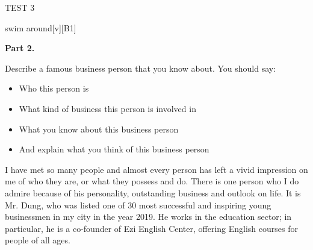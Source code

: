 \begin{glossarymc}[Cambridge 15]
\begin{test}{TEST 3}
\begin{VocabExplain}[Part 1]
            \begin{ExplainCard}{swim around}[v][B1]
            \end{ExplainCard}
        \end{VocabExplain}

    \noindent
    \textbf{Part 2.}
    \begin{qa}{Describe a famous business person that you know about. You should say:}
    \begin{itemize}
    \item Who this person is
    \item What kind of business this person is involved in
    \item What you know about this business person
    \item And explain what you think of this business person
    \end{itemize}

    I have met so many people and almost every person has left a vivid impression on me of who they are, or what they possess and do. There is one person who I do admire because of his personality, outstanding business and outlook on life. It is Mr. Dung, who was listed one of 30 most successful and inspiring young businessmen in my city in the year 2019. He works in the education sector; in particular, he is a co-founder of Ezi English Center, offering English courses for people of all ages.


\end{qa}
\end{test}
\end{glossarymc}
